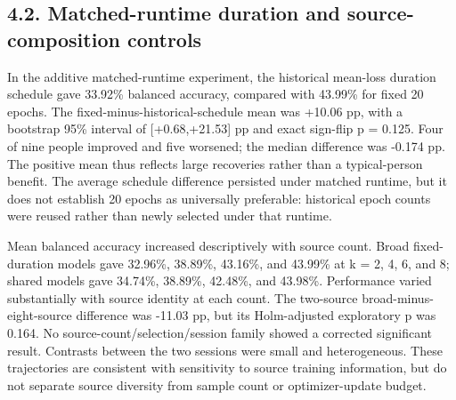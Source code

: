\documentclass[11pt]{article}
\begin{document}
\subsection*{4.2. Matched-runtime duration and source-composition controls}
In the additive matched-runtime experiment, the historical mean-loss duration schedule gave 33.92\% balanced accuracy, compared with 43.99\% for fixed 20 epochs. The fixed-minus-historical-schedule mean was +10.06 pp, with a bootstrap 95\% interval of [+0.68,+21.53] pp and exact sign-flip p = 0.125. Four of nine people improved and five worsened; the median difference was -0.174 pp. The positive mean thus reflects large recoveries rather than a typical-person benefit. The average schedule difference persisted under matched runtime, but it does not establish 20 epochs as universally preferable: historical epoch counts were reused rather than newly selected under that runtime.

Mean balanced accuracy increased descriptively with source count. Broad fixed-duration models gave 32.96\%, 38.89\%, 43.16\%, and 43.99\% at k = 2, 4, 6, and 8; shared models gave 34.74\%, 38.89\%, 42.48\%, and 43.98\%. Performance varied substantially with source identity at each count. The two-source broad-minus-eight-source difference was -11.03 pp, but its Holm-adjusted exploratory p was 0.164. No source-count/selection/session family showed a corrected significant result. Contrasts between the two sessions were small and heterogeneous. These trajectories are consistent with sensitivity to source training information, but do not separate source diversity from sample count or optimizer-update budget.
\end{document}
